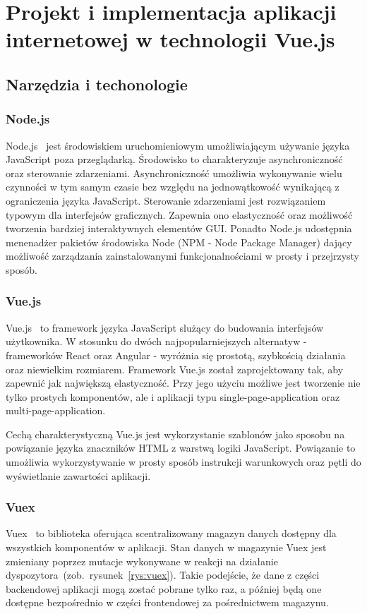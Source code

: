 
\chapter{Projekt i implementacja aplikacji internetowej w technologii Vue.js}
\section{Narzędzia i techonologie}
\subsection{Node.js}
Node.js~\cite{node} jest środowiskiem uruchomieniowym umożliwiającym używanie języka JavaScript poza przeglądarką. Środowisko to charakteryzuje asynchroniczność oraz sterowanie zdarzeniami. Asynchroniczność umożliwia wykonywanie wielu czynności w tym samym czasie bez względu na jednowątkowość wynikającą z ograniczenia języka JavaScript. Sterowanie zdarzeniami jest rozwiązaniem typowym dla interfejsów graficznych. Zapewnia ono elastyczność oraz możliwość tworzenia bardziej interaktywnych elementów GUI. Ponadto Node.js udostępnia menenadżer pakietów środowiska Node (NPM - Node Package Manager) dający możliwość zarządzania zainstalowanymi funkcjonalnościami w prosty i przejrzysty sposób.
\subsection{Vue.js}
Vue.js~\cite{vue} to framework języka JavaScript slużący do budowania interfejsów użytkownika. W stosunku do dwóch najpopularniejszych alternatyw - frameworków React oraz Angular - wyróżnia się prostotą, szybkością działania oraz niewielkim rozmiarem. Framework Vue.js został zaprojektowany tak, aby zapewnić jak największą elastyczność. Przy jego użyciu możliwe jest tworzenie nie tylko prostych komponentów, ale i aplikacji typu single-page-application oraz multi-page-application. 

Cechą charakterystyczną Vue.js jest wykorzystanie szablonów jako sposobu na powiązanie języka znaczników HTML z warstwą logiki JavaScript. Powiązanie to umożliwia wykorzystywanie w prosty sposób instrukcji warunkowych oraz pętli do wyświetlanie zawartości aplikacji.   

\subsection{Vuex}
Vuex~\cite{vuex} to biblioteka oferująca scentralizowany magazyn danych dostępny dla wszystkich komponentów w aplikacji. Stan danych w magazynie Vuex jest zmieniany poprzez mutacje wykonywane w reakcji na działanie dyspozytora~(zob.~rysunek~\ref{rys:vuex}). Takie podejście, że dane z części backendowej aplikacji mogą zostać pobrane tylko raz, a później będą one dostępne bezpośrednio w części frontendowej za pośrednictwem magazynu.

